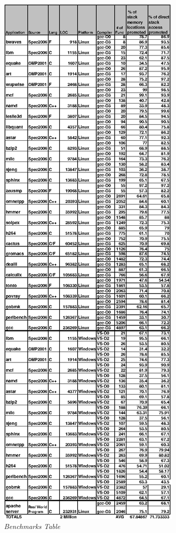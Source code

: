 \begin{figure}[t]
{
\centering
\includegraphics [width=0.7\linewidth] {figures/EPS/appTablenew2.eps} 
\caption { \textit{Benchmarks Table}}
\label{fig:appTable}
}
\vspace{-2ex}
\end{figure}
